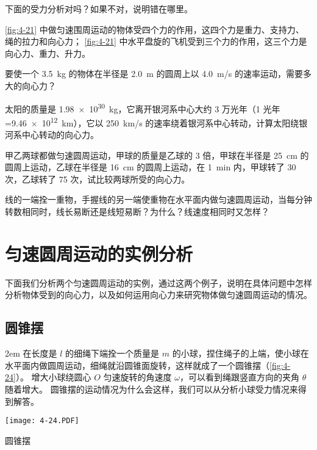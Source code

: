 \begin{Practice}
\begin{question}
	\item 下面的受力分析对吗？如果不对，说明错在哪里。
	\begin{tasks}
		\task \cref{fig:4-21} 中做匀速围周运动的物体受四个力的作用，这四个力是重力、支持力、绳的拉力和向心力；
		\task \cref{fig:4-21} 中水平盘旋的飞机受到三个力的作用，这三个力是向心力、重力、升力。
	\end{tasks}
\item 要使一个 \qty{3.5}{kg} 的物体在半径是 \qty{2.0}{m} 的圆周上以 \qty{4.0}{m/s} 的速率运动，需要多大的向心力？
\item 太阳的质量是 \qty{1.98e30}{kg}，它离开银河系中心大约 3 万光年（1 光年=\qty{9.46e12}{km}），它以 \qty{250}{km/s} 的速率绕着银河系中心转动，计算太阳绕银河系中心转动的向心力。
\item 甲乙两球都做匀速圆周运动，甲球的质量是乙球的 3 倍，甲球在半径是 \qty{25}{cm} 的圆周上运动，乙球在半径是 \qty{16}{cm} 的圆周上运动，在 \qty{1}{min} 内，甲球转了 30 次，乙球转了 75 次，试比较两球所受的向心力。
\item 线的一端拴一重物，手握线的另一端使重物在水平面内做匀速圆周运动，当每分钟转数相同时，线长易断还是线短易断？为什么？线速度相同时又怎样？
\end{question}
\end{Practice}

\section{匀速圆周运动的实例分析}
下面我们分析两个匀速圆周运动的实例，通过这两个例子，说明在具体问题中怎样分析物体受到的向心力，以及如何运用向心力来研究物体做匀速圆周运动的情况。

\subsection{圆锥摆}

\medskip\noindent
\begin{minipage}{0.55\linewidth}\parindent2em
在长度是 $l$ 的细绳下端拴一个质量是 $m$ 的小球，捏住绳子的上端，使小球在水平面内做圆周运动，细绳就沿圆锥面旋转，这样就成了一个圆锥摆（\cref{fig:4-24}）。
增大小球绕圆心 $O$ 匀速旋转的角速度 $\omega$，可以看到绳跟竖直方向的夹角 $\theta$ 随着增大。
圆锥摆的运动情况为什么会这样，我们可以从分析小球受力情况来得到解答。
\end{minipage}\hfill
\begin{minipage}{0.4\linewidth}\centering
\begin{figurehere}
  \texttt{[image: 4-24.PDF]}
  \caption{圆锥摆}\label{fig:4-24}
\end{figurehere}
\end{minipage}

